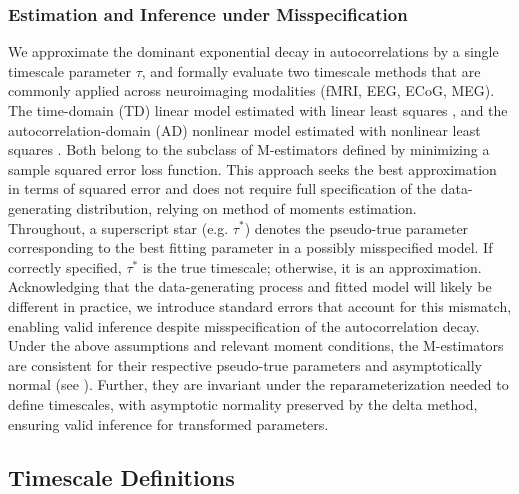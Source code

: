 \documentclass[9pt]{article}
\begin{document}
\subsubsection{Estimation and Inference under Misspecification}\label{sec:misspecification}

We approximate the dominant exponential decay in autocorrelations by a single timescale parameter $\tau$, and formally evaluate two timescale methods that are commonly applied across neuroimaging modalities (fMRI, EEG, ECoG, MEG). The time-domain (TD) linear model estimated with linear least squares \citep{kaneoke_variance_2012, meisel_decline_2017, huang_timescales_2018, lurie_cortical_2024, shinn_functional_2023, shafiei_topographic_2020, spitmaan_multiple_2020, trepka_training-dependent_2024}, and the autocorrelation-domain (AD) nonlinear model estimated with nonlinear least squares \citep{rossi-pool_invariant_2021, cirillo_neural_2018, ito_cortical_2020, runyan_distinct_2017, zeraati_flexible_2022, nougaret_intrinsic_2021, wasmuht_intrinsic_2018, muller_core_2020, maisson_choice-relevant_2021, li_hierarchical_2022, shafiei_topographic_2020}. Both belong to the subclass of M-estimators defined by minimizing a sample squared error loss function. This approach seeks the best approximation in terms of squared error and does not require full specification of the data-generating distribution, relying on method of moments estimation. \\

Throughout, a superscript star (e.g. $\tau^*$) denotes the pseudo-true parameter corresponding to the best fitting parameter in a possibly misspecified model. If correctly specified, $\tau^*$ is the true timescale; otherwise, it is an approximation. Acknowledging that the data-generating process and fitted model will likely be different in practice, we introduce standard errors that account for this mismatch, enabling valid inference despite misspecification of the autocorrelation decay. Under the above assumptions and relevant moment conditions, the M-estimators are consistent for their respective pseudo-true parameters and asymptotically normal (see ). Further, they are invariant under the reparameterization needed to define timescales, with asymptotic normality preserved by the delta method, ensuring valid inference for transformed parameters.

\subsection{Timescale Definitions}
\end{document}
